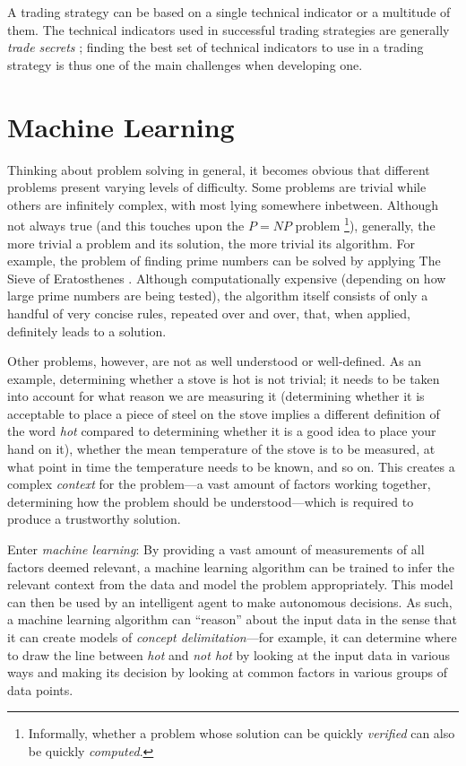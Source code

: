 \begin{multicols}{2}
A trading strategy can be based on a single technical indicator
\citep{connors2008} or a multitude of them.  The technical indicators used in
successful trading strategies are generally \textit{trade secrets}
\citep{Chan201305}; finding the best set of technical indicators to use in a
trading strategy is thus one of the main challenges when developing one.

\section{Machine Learning}

Thinking about problem solving in general, it becomes obvious that different
problems present varying levels of difficulty.  Some problems are trivial while
others are infinitely complex, with most lying somewhere inbetween.  Although
not always true (and this touches upon the $P=\mathit{NP}$ problem%
\footnote{Informally, whether a problem whose solution can be quickly
  \textit{verified} can also be quickly \textit{computed}.}), generally, the
more trivial a problem and its solution, the more trivial its algorithm.  For
example, the problem of finding prime numbers can be solved by applying The
Sieve of Eratosthenes \citep{eratosthenes}.  Although computationally expensive
(depending on how large prime numbers are being tested), the algorithm itself
consists of only a handful of very concise rules, repeated over and over, that,
when applied, definitely leads to a solution.

Other problems, however, are not as well understood or well-defined.  As an
example, determining whether a stove is hot is not trivial; it needs to be taken
into account for what reason we are measuring it (determining whether it is
acceptable to place a piece of steel on the stove implies a different definition
of the word \textit{hot} compared to determining whether it is a good idea to
place your hand on it), whether the mean temperature of the stove is to be
measured, at what point in time the temperature needs to be known, and so on.
This creates a complex \textit{context} for the problem---a vast amount of
factors working together, determining how the problem should be
understood---which is required to produce a trustworthy solution.

Enter \textit{machine learning}: By providing a vast amount of measurements of
all factors deemed relevant, a machine learning algorithm can be trained to
infer the relevant context from the data and model the problem
appropriately. This model can then be used by an intelligent agent to make
autonomous decisions.  As such, a machine learning algorithm can ``reason''
about the input data in the sense that it can create models of \textit{concept
  delimitation}---for example, it can determine where to draw the line between
\textit{hot} and \textit{not hot} by looking at the input data in various ways
and making its decision by looking at common factors in various groups of data
points.


\end{multicols}
